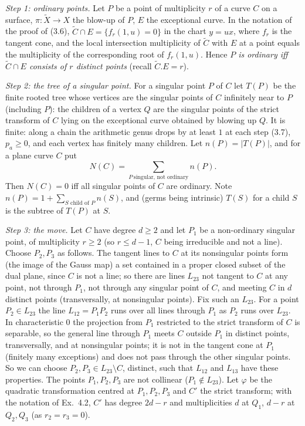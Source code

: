 \documentclass[11pt]{article}
\begin{document}
\emph{Step 1: ordinary points.} Let $P$ be a point of multiplicity $r$ of a curve $C$ on a surface, $\pi:\widetilde X\to X$ the blow-up of $P$, $E$ the exceptional curve. In the notation of the proof of (3.6), $\widetilde C\cap E=\{f_r(1,u)=0\}$ in the chart $y=ux$, where $f_r$ is the tangent cone, and the local intersection multiplicity of $\widetilde C$ with $E$ at a point equals the multiplicity of the corresponding root of $f_r(1,u)$. Hence \emph{$P$ is ordinary iff $\widetilde C\cap E$ consists of $r$ distinct points} (recall $\widetilde C.E=r$).

\emph{Step 2: the tree of a singular point.} For a singular point $P$ of $C$ let $T(P)$ be the finite rooted tree whose vertices are the singular points of $C$ infinitely near to $P$ (including $P$): the children of a vertex $Q$ are the singular points of the strict transform of $C$ lying on the exceptional curve obtained by blowing up $Q$. It is finite: along a chain the arithmetic genus drops by at least $1$ at each step (3.7), $p_a\ge0$, and each vertex has finitely many children. Let $n(P)=|T(P)|$, and for a plane curve $C$ put
\[
N(C)=\sum_{P\ \text{singular, not ordinary}}n(P).
\]
Then $N(C)=0$ iff all singular points of $C$ are ordinary. Note $n(P)=1+\sum_{S\text{ child of }P}n(S)$, and (germs being intrinsic) $T(S)$ for a child $S$ is the subtree of $T(P)$ at $S$.

\emph{Step 3: the move.} Let $C$ have degree $d\ge2$ and let $P_1$ be a non-ordinary singular point, of multiplicity $r\ge2$ (so $r\le d-1$, $C$ being irreducible and not a line). Choose $P_2,P_3$ as follows. The tangent lines to $C$ at its nonsingular points form (the image of the Gauss map) a set contained in a proper closed subset of the dual plane, since $C$ is not a line; so there are lines $L_{23}$ not tangent to $C$ at any point, not through $P_1$, not through any singular point of $C$, and meeting $C$ in $d$ distinct points (transversally, at nonsingular points). Fix such an $L_{23}$. For a point $P_2\in L_{23}$ the line $L_{12}=P_1P_2$ runs over all lines through $P_1$ as $P_2$ runs over $L_{23}$. In characteristic $0$ the projection from $P_1$ restricted to the strict transform of $C$ is separable, so the general line through $P_1$ meets $C$ outside $P_1$ in distinct points, transversally, and at nonsingular points; it is not in the tangent cone at $P_1$ (finitely many exceptions) and does not pass through the other singular points. So we can choose $P_2,P_3\in L_{23}\setminus C$, distinct, such that $L_{12}$ and $L_{13}$ have these properties. The points $P_1,P_2,P_3$ are not collinear ($P_1\notin L_{23}$). Let $\varphi$ be the quadratic transformation centred at $P_1,P_2,P_3$ and $C'$ the strict transform; with the notation of Ex.~4.2, $C'$ has degree $2d-r$ and multiplicities $d$ at $Q_1$, $d-r$ at $Q_2,Q_3$ (as $r_2=r_3=0$).
\end{document}
